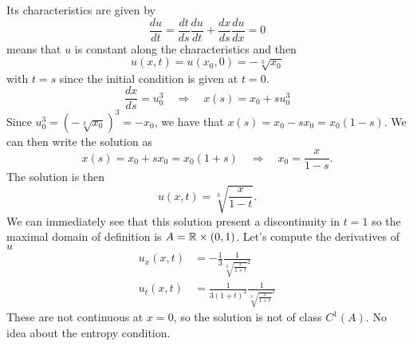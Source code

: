 \begin{enumerate}
          Its characteristics are given by
          \[
              \frac{du}{dt} = \frac{dt}{ds} \frac{du}{dt} + \frac{dx}{ds} \frac{du}{dx} = 0
          \]
          means that \(u\) is constant along the characteristics and then
          \[
              u(x,t) = u(x_0,0) = -\sqrt[3]{x_0}
          \]
          with \(t=s\) since the initial condition is given at \(t=0\).
          \[
              \frac{dx}{ds} = u_0^3 \quad \Rightarrow \quad x(s) = x_0 + s u_0^3
          \]
          Since \(u_0^3 = (-\sqrt[3]{x_0})^3 = -x_0\), we have that \(x(s) = x_0 - s x_0
          = x_0(1-s)\). We can then write the solution as
          \[
              x(s) = x_0 + s x_0 = x_0(1+s) \quad \Rightarrow \quad x_0 = \frac{x}{1-s}.
          \]
          The solution is then
          \[
              u(x,t) = \sqrt[3]{\frac{x}{1-t}}.
          \]
          We can immediately see that this solution present a discontinuity in \(t=1\) so
          the maximal domain of definition is \(A = \mathbb{R} \times (0, 1)\). Let's compute
          the derivatives of \(u\)
          \begin{align*}
              u_x(x,t) & = -\frac{1}{3} \frac{1}{\sqrt[2]{\frac{x}{1+t}}^2}       \\
              u_t(x,t) & = \frac{1}{3(1+t)^2} \frac{1}{\sqrt[3]{\frac{x}{1+t}}^2}
          \end{align*}
          These are not continuous at \(x=0\), so the solution is not of class \(C^1(A)\). No idea about the entropy condition.
\end{enumerate}


